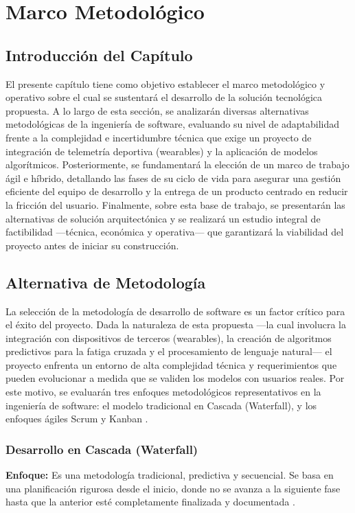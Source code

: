 \documentclass[12pt]{article}
\begin{document}
\section{Marco Metodológico}
\subsection{Introducción del Capítulo}

El presente capítulo tiene como objetivo establecer el marco metodológico y operativo sobre el cual se sustentará el desarrollo de la solución tecnológica propuesta. A lo largo de esta sección, se analizarán diversas alternativas metodológicas de la ingeniería de software, evaluando su nivel de adaptabilidad frente a la complejidad e incertidumbre técnica que exige un proyecto de integración de telemetría deportiva (wearables) y la aplicación de modelos algorítmicos. Posteriormente, se fundamentará la elección de un marco de trabajo ágil e híbrido, detallando las fases de su ciclo de vida para asegurar una gestión eficiente del equipo de desarrollo y la entrega de un producto centrado en reducir la fricción del usuario. Finalmente, sobre esta base de trabajo, se presentarán las alternativas de solución arquitectónica y se realizará un estudio integral de factibilidad ---técnica, económica y operativa--- que garantizará la viabilidad del proyecto antes de iniciar su construcción.
\subsection{Alternativa de Metodología}

La selección de la metodología de desarrollo de software es un factor crítico para el éxito del proyecto. Dada la naturaleza de esta propuesta ---la cual involucra la integración con dispositivos de terceros (wearables), la creación de algoritmos predictivos para la fatiga cruzada y el procesamiento de lenguaje natural--- el proyecto enfrenta un entorno de alta complejidad técnica y requerimientos que pueden evolucionar a medida que se validen los modelos con usuarios reales. Por este motivo, se evaluarán tres enfoques metodológicos representativos en la ingeniería de software: el modelo tradicional en Cascada (Waterfall), y los enfoques ágiles Scrum y Kanban \citep{sommerville2015}.

\newpage
\subsubsection{Desarrollo en Cascada (Waterfall)}
\textbf{Enfoque:} Es una metodología tradicional, predictiva y secuencial. Se basa en una planificación rigurosa desde el inicio, donde no se avanza a la siguiente fase hasta que la anterior esté completamente finalizada y documentada \citep{sommerville2015}.
\end{document}
